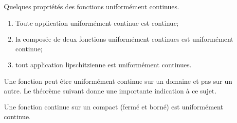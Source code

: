 \begin{proposition}
	Quelques propriétés des fonctions uniformément continues.
	\begin{enumerate}
		\item
			Toute application uniformément continue est continue;
		\item
			la composée de deux fonctions uniformément continues est uniformément continue;
		\item
			tout application lipschitzienne est uniformément continues.
	\end{enumerate}
\end{proposition}

Une fonction peut être uniformément continue sur un domaine et pas sur un autre. Le théorème suivant donne une importante indication à ce sujet.
\begin{theorem}[Heine]		\label{ThoHeineContinueCompact}
	Une fonction continue sur un compact (fermé et borné) est uniformément continue.
\end{theorem}

